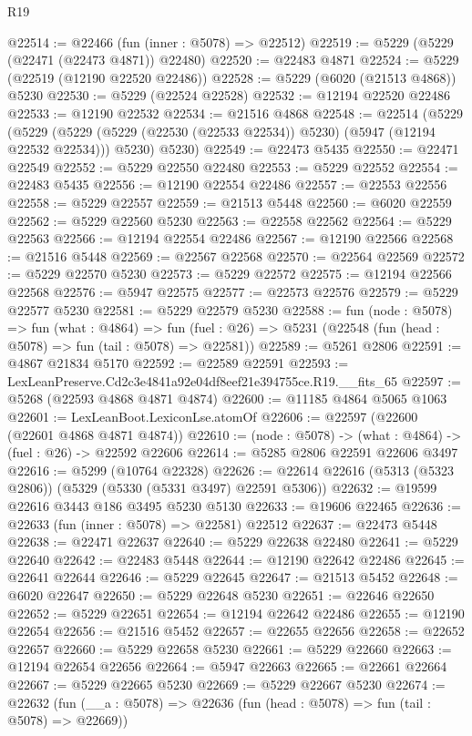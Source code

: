 \begin{lexlean}{R19}
\begin{coremodule}
@22514 := @22466 (fun (inner : @5078) => @22512)
@22519 := @5229 (@5229 (@22471 (@22473 @4871)) @22480)
@22520 := @22483 @4871
@22524 := @5229 (@22519 (@12190 @22520 @22486))
@22528 := @5229 (@6020 (@21513 @4868)) @5230
@22530 := @5229 (@22524 @22528)
@22532 := @12194 @22520 @22486
@22533 := @12190 @22532
@22534 := @21516 @4868
@22548 := @22514
    (@5229
      (@5229 (@5229 (@5229 (@22530 (@22533 @22534)) @5230) (@5947 (@12194 @22532 @22534))) @5230)
      @5230)
@22549 := @22473 @5435
@22550 := @22471 @22549
@22552 := @5229 @22550 @22480
@22553 := @5229 @22552
@22554 := @22483 @5435
@22556 := @12190 @22554 @22486
@22557 := @22553 @22556
@22558 := @5229 @22557
@22559 := @21513 @5448
@22560 := @6020 @22559
@22562 := @5229 @22560 @5230
@22563 := @22558 @22562
@22564 := @5229 @22563
@22566 := @12194 @22554 @22486
@22567 := @12190 @22566
@22568 := @21516 @5448
@22569 := @22567 @22568
@22570 := @22564 @22569
@22572 := @5229 @22570 @5230
@22573 := @5229 @22572
@22575 := @12194 @22566 @22568
@22576 := @5947 @22575
@22577 := @22573 @22576
@22579 := @5229 @22577 @5230
@22581 := @5229 @22579 @5230
@22588 := fun (node : @5078) =>
  fun (what : @4864) =>
  fun (fuel : @26) => @5231 (@22548 (fun (head : @5078) => fun (tail : @5078) => @22581))
@22589 := @5261 @2806
@22591 := @4867 @21834 @5170
@22592 := @22589 @22591
@22593 := LexLeanPreserve.Cd2c3e4841a92e04df8eef21e394755ce.R19.__fits_65
@22597 := @5268 (@22593 @4868 @4871 @4874)
@22600 := @11185 @4864 @5065 @1063
@22601 := LexLeanBoot.LexiconLse.atomOf
@22606 := @22597 (@22600 (@22601 @4868 @4871 @4874))
@22610 := (node : @5078) -> (what : @4864) -> (fuel : @26) -> @22592 @22606
@22614 := @5285 @2806 @22591 @22606 @3497
@22616 := @5299 (@10764 @22328)
@22626 := @22614 @22616 (@5313 (@5323 @2806)) (@5329 (@5330 (@5331 @3497) @22591 @5306))
@22632 := @19599 @22616 @3443 @186 @3495 @5230 @5130
@22633 := @19606 @22465
@22636 := @22633 (fun (inner : @5078) => @22581) @22512
@22637 := @22473 @5448
@22638 := @22471 @22637
@22640 := @5229 @22638 @22480
@22641 := @5229 @22640
@22642 := @22483 @5448
@22644 := @12190 @22642 @22486
@22645 := @22641 @22644
@22646 := @5229 @22645
@22647 := @21513 @5452
@22648 := @6020 @22647
@22650 := @5229 @22648 @5230
@22651 := @22646 @22650
@22652 := @5229 @22651
@22654 := @12194 @22642 @22486
@22655 := @12190 @22654
@22656 := @21516 @5452
@22657 := @22655 @22656
@22658 := @22652 @22657
@22660 := @5229 @22658 @5230
@22661 := @5229 @22660
@22663 := @12194 @22654 @22656
@22664 := @5947 @22663
@22665 := @22661 @22664
@22667 := @5229 @22665 @5230
@22669 := @5229 @22667 @5230
@22674 := @22632 (fun (__a : @5078) => @22636 (fun (head : @5078) => fun (tail : @5078) => @22669))

\end{coremodule}
\end{lexlean}
